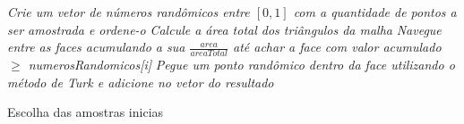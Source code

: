 \begin{algorithm}
\DontPrintSemicolon
{}
\BlankLine
\emph{Crie um vetor de números randômicos entre $[0,1]$ com a quantidade de pontos a ser amostrada e ordene-o}\;
\emph{Calcule a área total dos triângulos da malha}\;
 {
  \emph{Navegue entre as faces acumulando a sua $\frac{area}{areaTotal}$ até achar a face com valor acumulado $\geqslant$ numerosRandomicos[i]}\;
  \emph{Pegue um ponto randômico dentro da face utilizando o método de Turk e adicione no vetor do resultado}\;
}
\caption{Escolha das amostras inicias}\label{alg:sampling}
\end{algorithm}\DecMargin{1em}







